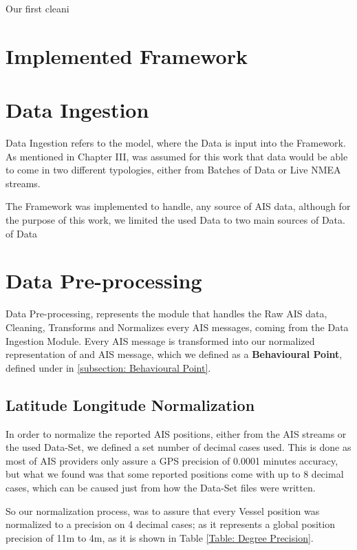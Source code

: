 Our first cleani

\section{Implemented Framework}

\section{Data Ingestion}
\todo[inline]{}
Data Ingestion refers to the model, where the Data is input into the Framework. As mentioned in Chapter III, was assumed for this work that data would be able to come in two different typologies, either from Batches of Data or Live NMEA streams. 

The Framework was implemented to handle, any source of AIS data, although for the purpose of this work, we limited the used Data to two main sources of Data. of Data

\section{Data Pre-processing}
Data Pre-processing, represents the module that handles the Raw AIS data, Cleaning, Transforms and Normalizes every AIS messages, coming from the Data Ingestion Module. Every AIS message is transformed into our normalized representation of and AIS message, which we defined as a \textbf{Behavioural Point}, defined under in \ref{subsection: Behavioural Point}.

\subsection{Latitude Longitude Normalization}
In order to normalize the reported AIS positions, either from the AIS streams or the used Data-Set, we defined a set number of decimal cases used. This is done as most of AIS providers only assure a GPS precision of 0.0001 minutes accuracy, but what we found was that some reported positions come with up to 8 decimal cases, which can be caused just from how the Data-Set files were written.

So our normalization process, was to assure that every Vessel position was normalized to a precision on 4 decimal cases; as it represents a global position precision of 11m to 4m, as it is shown in Table \ref{Table: Degree Precision}.

